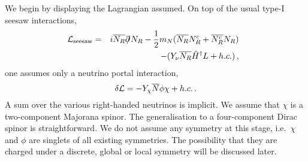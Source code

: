 \documentclass[prd,a4paper,twocolumn,preprintnumbers,nofootinbib,superscriptaddress]{revtex4}
\begin{document}
We begin by displaying the Lagrangian assumed. On top of the usual type-I seesaw interactions, 
\begin{eqnarray}
	\hspace{-0.2cm}
	{\cal L}_\text{seesaw}&=&i \overline{N_R}\partial \hspace{-1.5mm} \slash N_R-\frac{1}{2} m_N (\overline{N_R} N_R^c+\overline{N_R^c} N_R)\nonumber\\
	&& -(Y_\nu \overline{N_R} \tilde{H}^\dagger L+h.c.)\, ,
	\label{seesaw}
	\end{eqnarray}
one assumes only a neutrino portal interaction, 
\begin{equation}
	\delta{\cal L} =  -Y_\chi \overline{N} \phi \chi  +h.c.\,.
	\label{LagrchiN}
\end{equation}
A sum over the various right-handed neutrinos is implicit.
We assume that $\chi$ is a two-component Majorana spinor. The generalisation to a four-component Dirac spinor is straightforward. We do not assume any symmetry at this stage, i.e.~$\chi$ and $\phi$ are singlets of all existing symmetries. 
The possibility that they are charged under a discrete, global or local symmetry will be discussed later.
	
\end{document}
